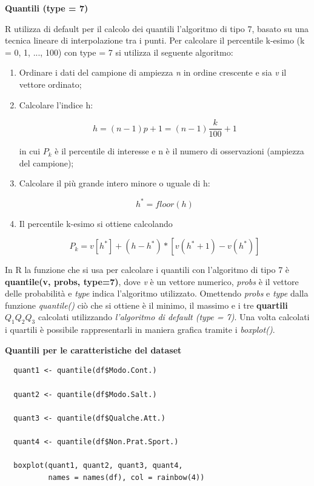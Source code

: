 \vspace{5mm}
\noindent \textbf{Quantili (type = 7)}
\vspace{5mm}

R utilizza di default per il calcolo dei quantili l'algoritmo di tipo 7, basato su una tecnica lineare di interpolazione tra i punti. Per calcolare il percentile k-esimo (k = 0, 1, ..., 100) con type = 7 si utilizza il seguente algoritmo:

\begin{enumerate}
  \item Ordinare i dati del campione di ampiezza \textit{n} in ordine crescente e sia \textit{v} il vettore ordinato;
  \item Calcolare l'indice h:

  \[h = (n-1)p+1 = (n-1)\frac{k}{100}+1 \]

  in cui $P_k$ è il percentile di interesse e n è il numero di osservazioni (ampiezza del campione);
  \item Calcolare il più grande intero minore o uguale di h:

  \[h^* = floor(h)\]

  \item Il percentile k-esimo si ottiene calcolando

  \[P_k = v[h^*]+(h-h^*)*[v(h^*+1)-v(h^*)]\]
  
\end{enumerate}

In R la funzione che si usa per calcolare i quantili con l'algoritmo di tipo 7 è \textbf{quantile(v, probs, type=7)}, dove \textit{v} è un vettore numerico, \textit{probs} è il vettore delle probabilità e \textit{type} indica l'algoritmo utilizzato. Omettendo \textit{probs} e \textit{type} dalla funzione \textit{quantile()} ciò che si ottiene è il minimo, il massimo e i tre \textbf{quartili} $Q_1 Q_2 Q_3$ calcolati utilizzando \textit{l'algoritmo di default (type = 7)}. Una volta calcolati i quartili è possibile rappresentarli in maniera grafica tramite i \textit{boxplot()}.

\vspace{5mm}
\noindent \textbf{Quantili per le caratteristiche del dataset}

\begin{lstlisting}
  quant1 <- quantile(df$Modo.Cont.)

  quant2 <- quantile(df$Modo.Salt.)

  quant3 <- quantile(df$Qualche.Att.)

  quant4 <- quantile(df$Non.Prat.Sport.)

  boxplot(quant1, quant2, quant3, quant4,
          names = names(df), col = rainbow(4))
\end{lstlisting}

